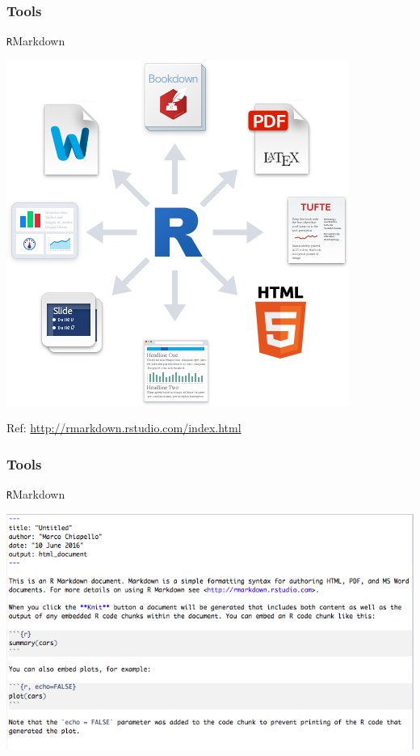 \documentclass{beamer}
\begin{document}

\begin{frame}
\frametitle{Tools}
\begin{center}\Large\texttt{R}Markdown\end{center}
\begin{center}\includegraphics[scale=0.35]{figures/RMarkdownOutputFormats.png}\end{center}
\begin{center}\tiny Ref: {\url{http://rmarkdown.rstudio.com/index.html}}\end{center}
\end{frame}
\begin{frame}
\frametitle{Tools}
\begin{center}\Large\texttt{R}Markdown\end{center}
\begin{center}\includegraphics[scale=0.45]{figures/RMarkdown.png}\end{center}
\end{frame}
\end{document}
